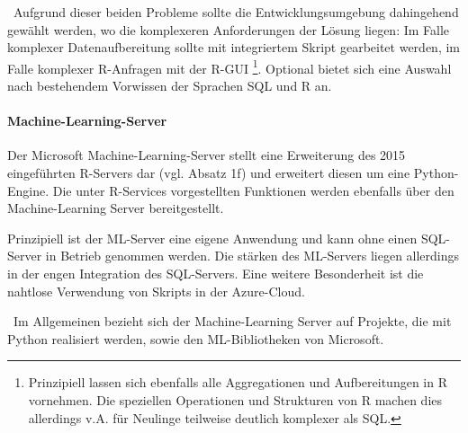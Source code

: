 ~\newline Aufgrund dieser beiden Probleme sollte die Entwicklungsumgebung dahingehend gewählt werden, wo die komplexeren Anforderungen der Lösung liegen: Im Falle komplexer Datenaufbereitung sollte mit integriertem Skript gearbeitet werden, im Falle komplexer R-Anfragen mit der R-GUI \footnote{Prinzipiell lassen sich ebenfalls alle Aggregationen und Aufbereitungen in R vornehmen. Die speziellen Operationen und Strukturen von R machen dies allerdings v.A. für Neulinge teilweise deutlich komplexer als SQL.}.  Optional bietet sich eine Auswahl nach bestehendem Vorwissen der Sprachen SQL und R an. 

\paragraph{Machine-Learning-Server} 
Der Microsoft Machine-Learning-Server stellt eine Erweiterung des 2015 eingeführten R-Servers dar (vgl. \cite{MLServerInfo} Absatz 1f)  und erweitert diesen um eine Python-Engine. Die unter R-Services vorgestellten Funktionen werden ebenfalls über den Machine-Learning Server bereitgestellt. 

Prinzipiell ist der ML-Server eine eigene Anwendung und kann ohne einen SQL-Server in Betrieb genommen werden. Die stärken des ML-Servers liegen allerdings in der engen Integration des SQL-Servers. Eine weitere Besonderheit ist die nahtlose Verwendung von Skripts in der Azure-Cloud. 

~\newline Im Allgemeinen bezieht sich der Machine-Learning Server auf Projekte, die mit Python realisiert werden, sowie den ML-Bibliotheken von Microsoft.